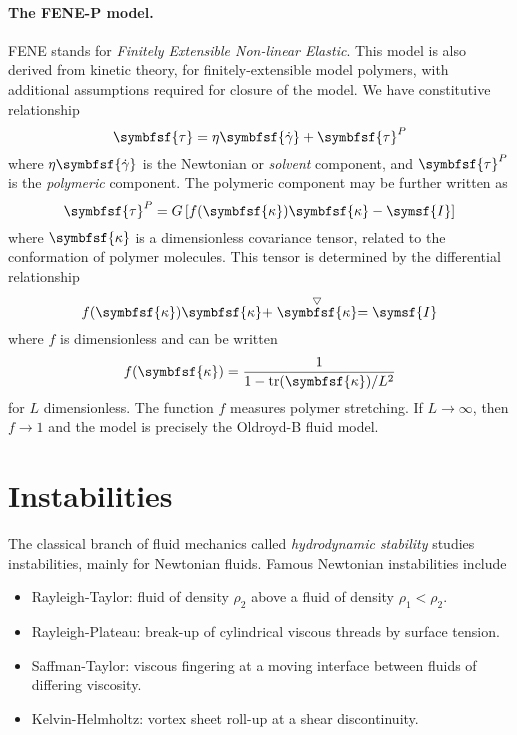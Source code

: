 \documentclass{jknotes}
\begin{document}
\paragraph{The FENE-P model.}
FENE stands for \emph{Finitely Extensible Non-linear Elastic}. This model is
also derived from kinetic theory, for finitely-extensible model polymers, with
additional assumptions required for closure of the model. We have constitutive
relationship
\begin{equation}
	\symbfsf{\tau} = \eta \symbfsf{\srate} + \symbfsf{\tau}^P
\end{equation}
where $\eta \symbfsf{\srate}$ is the Newtonian or \emph{solvent} component,
and $\symbfsf{\tau}^P$ is the \emph{polymeric} component. The polymeric
component may be further written as
\begin{equation}
	\symbfsf{\tau}^P = G\left[ f(\symbfsf{\kappa})\symbfsf{\kappa} -
	\symsf{I}\right]
\end{equation}
where $\symbfsf{\kappa}$ is a dimensionless covariance tensor, related to the
conformation of polymer molecules. This tensor is determined by the
differential relationship
\begin{equation}
	f(\symbfsf{\kappa})\symbfsf{\kappa} +
	\stackrel{\bigtriangledown}{\symbfsf{\kappa}} = \symsf{I}
\end{equation}
where $f$ is dimensionless and can be written
\begin{equation}
	f(\symbfsf{\kappa}) = \frac{1}{1- \text{tr}(\symbfsf{\kappa})/L^2}
\end{equation}
for $L$ dimensionless. The function $f$ measures polymer stretching. If $L \to
\infty$, then $f \to 1$ and the model is precisely the Oldroyd-B fluid model.

\section{Instabilities}
The classical branch of fluid mechanics called \emph{hydrodynamic stability}
studies instabilities, mainly for Newtonian fluids. Famous Newtonian
instabilities include
\begin{itemize}
	\item Rayleigh-Taylor: fluid of density $\rho_2$ above a fluid of density
		$\rho_1 < \rho_2$.
	\item Rayleigh-Plateau: break-up of cylindrical viscous threads by surface
		tension.
	\item Saffman-Taylor: viscous fingering at a moving interface between
		fluids of differing viscosity.
	\item Kelvin-Helmholtz: vortex sheet roll-up at a shear discontinuity.
\end{itemize}
\end{document}
